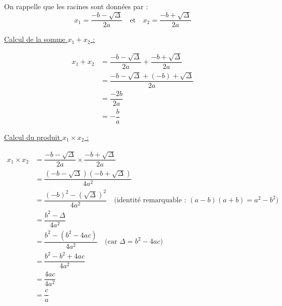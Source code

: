 \documentclass[a4paper,11pt,fleqn]{article}
\begin{document}
\newpage
\begin{Demonstration}
    
On rappelle que les racines sont données par :
$$x_1 = \dfrac{-b - \sqrt{\Delta}}{2a} \quad \text{et} \quad x_2 = \dfrac{-b + \sqrt{\Delta}}{2a}$$

\vspace{0.3cm}

\underline{Calcul de la somme $x_1 + x_2$ :}

\begin{align*}
x_1 + x_2 &= \dfrac{-b - \sqrt{\Delta}}{2a} + \dfrac{-b + \sqrt{\Delta}}{2a} \\
&= \dfrac{-b - \sqrt{\Delta} + (-b) + \sqrt{\Delta}}{2a} \\
&= \dfrac{-2b}{2a} \\
&= -\dfrac{b}{a}
\end{align*}

\vspace{0.3cm}

\underline{Calcul du produit $x_1 \times x_2$ :}

\begin{align*}
x_1 \times x_2 &= \dfrac{-b - \sqrt{\Delta}}{2a} \times \dfrac{-b + \sqrt{\Delta}}{2a} \\
&= \dfrac{(-b - \sqrt{\Delta})(-b + \sqrt{\Delta})}{4a^2} \\
&= \dfrac{(-b)^2 - (\sqrt{\Delta})^2}{4a^2} \quad \text{(identité remarquable : $(a-b)(a+b) = a^2 - b^2$)} \\
&= \dfrac{b^2 - \Delta}{4a^2} \\
&= \dfrac{b^2 - (b^2 - 4ac)}{4a^2} \quad \text{(car $\Delta = b^2 - 4ac$)} \\
&= \dfrac{b^2 - b^2 + 4ac}{4a^2} \\
&= \dfrac{4ac}{4a^2} \\
&= \dfrac{c}{a}
\end{align*}

\vspace{0.5cm}

\noindent{}

\end{Demonstration}
\end{document}
